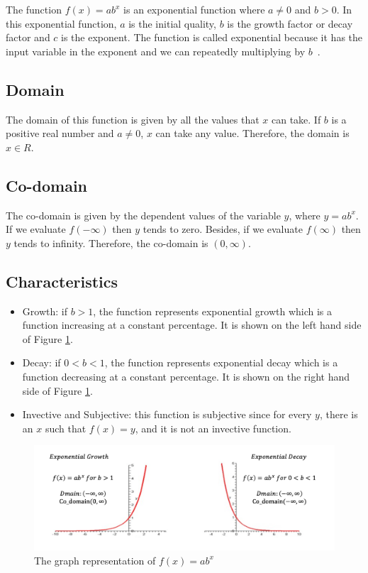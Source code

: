 \documentclass[11pt]{article}
\begin{document}
The function $f(x) = ab^x$ is an exponential function where $a\neq0$ and $b>0$. In this exponential function, $a$ is the initial quality, $b$ is the growth factor or decay factor and $c$ is the exponent. The function is called exponential because it has the input variable in the exponent and we can repeatedly multiplying by $b$~\cite{browder2012mathematical}.

\subsection{Domain}
The domain of this function is given by all the values that $x$ can take. If $b$ is a positive real number and $a \neq 0$, $x$ can take any value. Therefore, the domain is \textbf{$x\in R$}.

\subsection{Co-domain}
The co-domain is given by the dependent values of the variable $y$, where $y = ab^x$. If we evaluate $f(-\infty)$ then $y$ tends to zero. Besides, if we evaluate $f(\infty)$ then $y$ tends to infinity\cite{Anu:2013}.
Therefore, the co-domain is $(0, \infty)$.

\subsection{Characteristics}
\begin{itemize}
    \item Growth: if $b>1$, the function represents exponential growth which is a function increasing at a constant percentage. It is shown on the left hand side of Figure \ref{fig:my_label}.
    \item Decay: if $0<b<1$, the function represents exponential decay which is a function decreasing at a constant percentage. It is shown on the right hand side of Figure \ref{fig:my_label}.
    \item Invective and Subjective: this function is subjective since for every $y$, there is an $x$ such that $f(x) = y$, and it is not an invective function.
\end{itemize}

\begin{figure}[h]
    \centering
    \includegraphics[width=12cm]{images/Function.png}
    \caption{The graph representation of $f(x) = ab^x$}
    \label{fig:my_label}
\end{figure}
\end{document}
